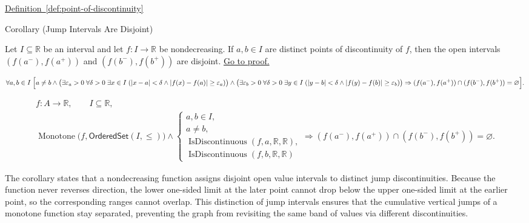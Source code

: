 \begin{dependencies}
\hyperref[def:point-of-discontinuity]{Definition~\ref{def:point-of-discontinuity}}
\end{dependencies}

\begin{corollarybox}{Corollary (Jump Intervals Are Disjoint)}
\begin{corollary}
\label{cor:jump-intervals-for-monotone-discontinuities}
Let $I \subseteq \mathbb{R}$ be an interval and let $f:I \to \mathbb{R}$ be nondecreasing. If $a,b \in I$ are distinct points of discontinuity of $f$, then the open intervals $(f(a^-),f(a^+))$ and $(f(b^-),f(b^+))$ are disjoint.%
\hyperref[prf:jump-intervals-for-monotone-discontinuities]{Go to proof.}
\end{corollary}
\end{corollarybox}

\begin{remark*}
\[
\forall a,b\in I\;
\Bigl[
a\ne b\land
\bigl(\exists \varepsilon_a>0\;\forall \delta>0\;\exists x\in I\;
(|x-a|<\delta\land |f(x)-f(a)|\ge\varepsilon_a)\bigr)\land
\bigl(\exists \varepsilon_b>0\;\forall \delta>0\;\exists y\in I\;
(|y-b|<\delta\land |f(y)-f(b)|\ge\varepsilon_b)\bigr)
\Rightarrow
(f(a^-),f(a^+))\cap(f(b^-),f(b^+))=\varnothing
\Bigr].
\]
\end{remark*}

\begin{remark*}
\[
\begin{aligned}
  f\colon A\to\mathbb{R},\qquad
  I\subseteq\mathbb{R},\\
\operatorname{Monotone}\bigl(f,\mathsf{OrderedSet}(I,\leq)\bigr)\land
\begin{cases}
a,b\in I,\\
a\neq b,\\
\operatorname{IsDiscontinuous}(f,a,\mathbb{R},\mathbb{R}),\\
\operatorname{IsDiscontinuous}(f,b,\mathbb{R},\mathbb{R})
\end{cases}
\Longrightarrow
(f(a^-),f(a^+))\cap(f(b^-),f(b^+))=\varnothing.
\end{aligned}
\]
\end{remark*}

\begin{remark*}[Interpretation]
The corollary states that a nondecreasing function assigns disjoint open value intervals to distinct jump discontinuities. Because the function never reverses direction, the lower one-sided limit at the later point cannot drop below the upper one-sided limit at the earlier point, so the corresponding ranges cannot overlap. This distinction of jump intervals ensures that the cumulative vertical jumps of a monotone function stay separated, preventing the graph from revisiting the same band of values via different discontinuities.
\end{remark*}

